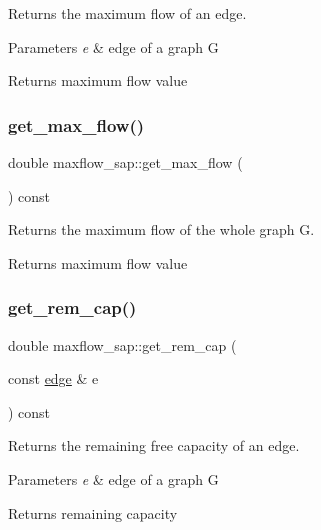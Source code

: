 Returns the maximum flow of an edge.


\begin{DoxyParams}{Parameters}
{\em e} & edge of a graph {\ttfamily G} \\
\hline
\end{DoxyParams}
\begin{DoxyReturn}{Returns}
maximum flow value 
\end{DoxyReturn}
\mbox{\label{classmaxflow__sap_a81251d546cbdabc837f24fc3caf9fe0d}} 
\subsubsection{\texorpdfstring{get\+\_\+max\+\_\+flow()}{get\_max\_flow()}\hspace{0.1cm}{\footnotesize\ttfamily [2/2]}}
{\footnotesize\ttfamily double maxflow\+\_\+sap\+::get\+\_\+max\+\_\+flow (\begin{DoxyParamCaption}{ }\end{DoxyParamCaption}) const}

Returns the maximum flow of the whole graph G.

\begin{DoxyReturn}{Returns}
maximum flow value 
\end{DoxyReturn}
\mbox{\label{classmaxflow__sap_a634835664542d5d181e1b63b99dda36c}} 
\subsubsection{\texorpdfstring{get\+\_\+rem\+\_\+cap()}{get\_rem\_cap()}}
{\footnotesize\ttfamily double maxflow\+\_\+sap\+::get\+\_\+rem\+\_\+cap (\begin{DoxyParamCaption}\item[{const \mbox{\hyperlink{classedge}{edge}} \&}]{e }\end{DoxyParamCaption}) const}

Returns the remaining free capacity of an edge.


\begin{DoxyParams}{Parameters}
{\em e} & edge of a graph {\ttfamily G} \\
\hline
\end{DoxyParams}
\begin{DoxyReturn}{Returns}
remaining capacity 
\end{DoxyReturn}
\mbox{\label{classmaxflow__sap_a14574d2f9ce31a3cdeb0888e57fc0616}} 
